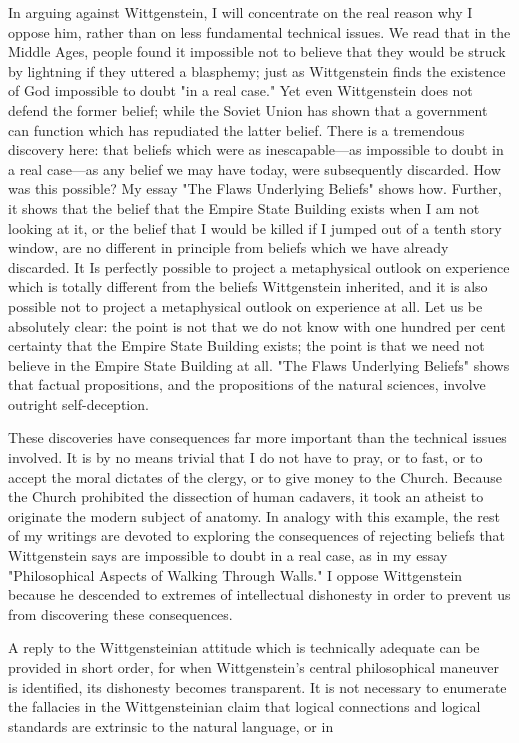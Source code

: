 \documentclass[10pt,twoside]{memoir}
\begin{document}
\begin{enumerate}
{{{{{In arguing against Wittgenstein, I will concentrate on the real reason 
why I oppose him, rather than on less fundamental technical issues. We read 
that in the Middle Ages, people found it impossible not to believe that they 
would be struck by lightning if they uttered a blasphemy; just as 
Wittgenstein finds the existence of God impossible to doubt "in a real case." 
Yet even Wittgenstein does not defend the former belief; while the Soviet 
Union has shown that a government can function which has repudiated the 
latter belief. There is a tremendous discovery here: that beliefs which were as 
inescapable---as impossible to doubt in a real case---as any belief we may have 
today, were subsequently discarded. How was this possible? My essay "The 
Flaws Underlying Beliefs" shows how. Further, it shows that the belief that 
the Empire State Building exists when I am not looking at it, or the belief 
that I would be killed if I jumped out of a tenth story window, are no 
different in principle from beliefs which we have already discarded. It Is 
perfectly possible to project a metaphysical outlook on experience which is 
totally different from the beliefs Wittgenstein inherited, and it is also 
possible not to project a metaphysical outlook on experience at all. Let us be 
absolutely clear: the point is not that we do not know with one hundred per 
cent certainty that the Empire State Building exists; the point is that we 
need not believe in the Empire State Building at all. "The Flaws Underlying 
Beliefs" shows that factual propositions, and the propositions of the natural 
sciences, involve outright self-deception. 

These discoveries have consequences far more important than the 
technical issues involved. It is by no means trivial that I do not have to pray, 
or to fast, or to accept the moral dictates of the clergy, or to give money to 
the Church. Because the Church prohibited the dissection of human 
cadavers, it took an atheist to originate the modern subject of anatomy. In 
analogy with this example, the rest of my writings are devoted to exploring 
the consequences of rejecting beliefs that Wittgenstein says are impossible to 
doubt in a real case, as in my essay "Philosophical Aspects of Walking 
Through Walls." I oppose Wittgenstein because he descended to extremes of 
intellectual dishonesty in order to prevent us from discovering these 
consequences. 

A reply to the Wittgensteinian attitude which is technically adequate 
can be provided in short order, for when Wittgenstein's central philosophical 
maneuver is identified, its dishonesty becomes transparent. It is not 
necessary to enumerate the fallacies in the Wittgensteinian claim that logical 
connections and logical standards are extrinsic to the natural language, or in 


}}}}}
\end{enumerate}
\end{document}
